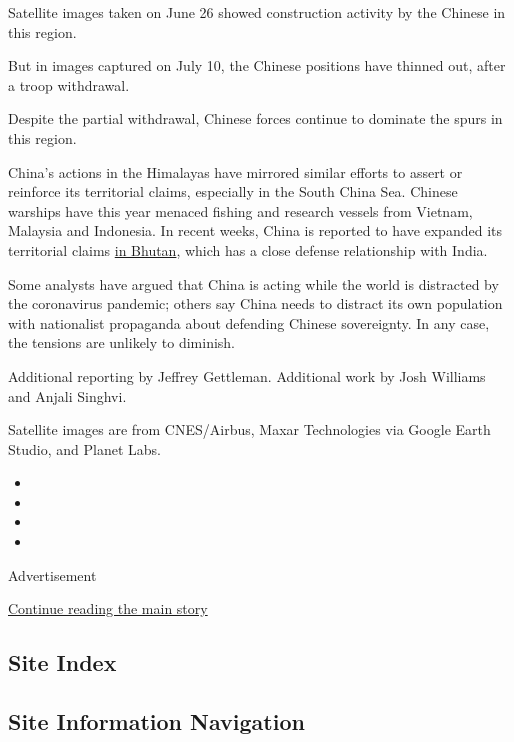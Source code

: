 Satellite images taken on June 26 showed construction activity by the
Chinese in this region.

But in images captured on July 10, the Chinese positions have thinned
out, after a troop withdrawal.

Despite the partial withdrawal, Chinese forces continue to dominate the
spurs in this region.

China's actions in the Himalayas have mirrored similar efforts to assert
or reinforce its territorial claims, especially in the South China Sea.
Chinese warships have this year menaced fishing and research vessels
from Vietnam, Malaysia and Indonesia. In recent weeks, China is reported
to have expanded its territorial claims
\href{https://thediplomat.com/2020/07/whats-behind-chinas-expansion-of-its-territorial-dispute-with-bhutan/}{in
Bhutan}, which has a close defense relationship with India.

Some analysts have argued that China is acting while the world is
distracted by the coronavirus pandemic; others say China needs to
distract its own population with nationalist propaganda about defending
Chinese sovereignty. In any case, the tensions are unlikely to diminish.

Additional reporting by Jeffrey Gettleman. Additional work by Josh
Williams and Anjali Singhvi.

Satellite images are from CNES/Airbus, Maxar Technologies via Google
Earth Studio, and Planet Labs.

\begin{itemize}
\item
\item
\item
\item
\end{itemize}

Advertisement

\protect\hyperlink{after-bottom}{Continue reading the main story}

\hypertarget{site-index}{%
\subsection{Site Index}\label{site-index}}

\hypertarget{site-information-navigation}{%
\subsection{Site Information
Navigation}\label{site-information-navigation}}

